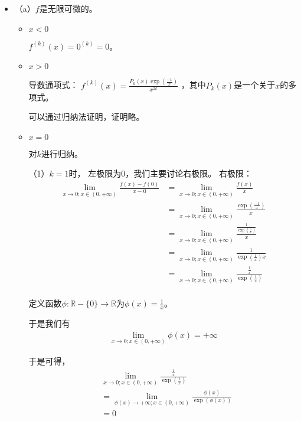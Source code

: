 \documentclass{article}
\begin{document}
\begin{itemize}
  \item （a）$f$是无限可微的。

        \begin{itemize}
          \item $x < 0$

                $f^{(k)}(x) = 0^{(k)} = 0$。
          \item $x > 0$

                导数通项式：
                $f^{(k)}(x) = \frac{P_k(x)\exp(\frac{-1}{x})}{x^{2k}}$
                ，其中$P_k(x)$是一个关于$x$的多项式。

                可以通过归纳法证明，证明略。

          \item $x = 0$

                对$k$进行归纳。

                （1）$k = 1$时，
                左极限为$0$，我们主要讨论右极限。
                右极限：
                \begin{align*}
                  \lim\limits_{x \to 0; x \in (0, + \infty)} \frac{f(x) - f(0)}{x - 0}
                   & = \lim\limits_{x \to 0; x \in (0, + \infty)} \frac{f(x)}{x}                        \\
                   & = \lim\limits_{x \to 0; x \in (0, + \infty)} \frac{\exp(\frac{-1}{x})}{x}          \\
                   & = \lim\limits_{x \to 0; x \in (0, + \infty)} \frac{\frac{1}{\exp(\frac{1}{x})}}{x} \\
                   & = \lim\limits_{x \to 0; x \in (0, + \infty)} \frac{1}{\exp(\frac{1}{x})x}          \\
                   & = \lim\limits_{x \to 0; x \in (0, + \infty)} \frac{\frac{1}{x}}{\exp(\frac{1}{x})} \\
                \end{align*}

                定义函数$\phi: \mathbb{R} - \{0\} \to \mathbb{R}$为$\phi(x) = \frac{1}{x}$。

                于是我们有
                \begin{align*}
                  \lim\limits_{x \to 0; x \in (0, + \infty)} \phi(x) = +\infty
                \end{align*}

                于是可得，
                \begin{align*}
                   & \lim\limits_{x \to 0; x \in (0, + \infty)} \frac{\frac{1}{x}}{\exp(\frac{1}{x})}        \\
                   & =  \lim\limits_{\phi(x) \to +\infty; x \in (0, + \infty)} \frac{\phi(x)}{\exp(\phi(x))} \\
                   & = 0
                \end{align*}


\end{itemize}
\end{itemize}
\end{document}
